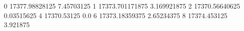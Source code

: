 0 17377.98828125 7.45703125
1 17373.701171875 3.169921875
2 17370.56640625 0.03515625
4 17370.53125 0.0
6 17373.18359375 2.65234375
8 17374.453125 3.921875
